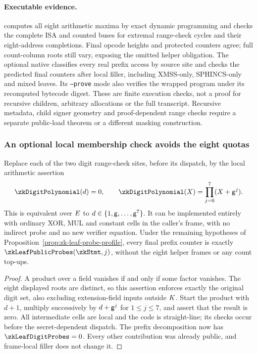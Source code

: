 \paragraph{Executable evidence.}  computes all eight arithmetic maxima by exact dynamic programming and checks the complete ISA and counted buses for extremal range-check cycles and their eight-address completions. Final opcode heights and protected counters agree; full count-column roots still vary, exposing the omitted helper obligation. The optional native  classifies every real prefix access by source site and checks the predicted final counters after local filler, including XMSS-only, SPHINCS-only and mixed leaves. Its \texttt{--prove} mode also verifies the wrapped program under its recomputed bytecode digest. These are finite execution checks, not a proof for recursive children, arbitrary allocations or the full transcript. Recursive metadata, child signer geometry and proof-dependent range checks require a separate public-load theorem or a different masking construction.

\subsubsection{An optional local membership check avoids the eight quotas}

\begin{proposition}\label{prop:zk-local-digit-membership}
Replace each of the two digit range-check sites, before its dispatch, by the local arithmetic assertion
\[
 \zkDigitPolynomial(d)=0,
 \qquad \zkDigitPolynomial(X)=\prod_{j=0}^7(X+\gen^j).
\]
This is equivalent over $E$ to $d\in\{1,\mathsf{g},\ldots,\mathsf{g}^7\}$. It can be implemented entirely with ordinary XOR, MUL and constant cells in the caller's frame, with no indirect probe and no new verifier equation. Under the remaining hypotheses of Proposition~\ref{prop:zk-leaf-probe-profile}, every final prefix counter is exactly $\zkLeafPublicProbes(\zkStmt,j)$, without the eight helper frames or any count top-ups.
\end{proposition}
\begin{proof}
A product over a field vanishes if and only if some factor vanishes. The eight displayed roots are distinct, so this assertion enforces exactly the original digit set, also excluding extension-field inputs outside $K$. Start the product with $d+1$, multiply successively by $d+\mathsf{g}^j$ for $1\le j\le7$, and assert that the result is zero. All intermediate cells are local and the code is straight-line; its checks occur before the secret-dependent dispatch. The prefix decomposition now has $\zkLeafDigitProbes=0$. Every other contribution was already public, and frame-local filler does not change it.
\end{proof}

